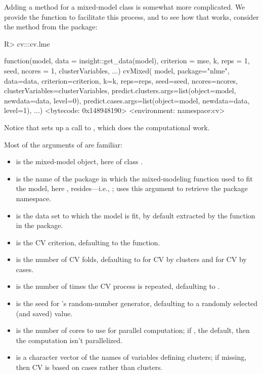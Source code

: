 \documentclass[
]{jss}
\begin{document}
Adding a  method for a mixed-model class is somewhat more
complicated. We provide the  function to facilitate this
process, and to see how that works, consider the  method
from the  package:

\begin{CodeChunk}
\begin{CodeInput}
R> cv:::cv.lme
\end{CodeInput}
\begin{CodeOutput}
function(model, data = insight::get_data(model), criterion = mse,
                   k, reps = 1, seed, ncores = 1, clusterVariables, ...){
  cvMixed(
    model,
    package="nlme",
    data=data,
    criterion=criterion,
    k=k,
    reps=reps,
    seed=seed,
    ncores=ncores,
    clusterVariables=clusterVariables,
    predict.clusters.args=list(object=model,
                               newdata=data,
                               level=0),
    predict.cases.args=list(object=model,
                            newdata=data,
                            level=1),
    ...)
}
<bytecode: 0x148948190>
<environment: namespace:cv>
\end{CodeOutput}
\end{CodeChunk}

Notice that  sets up a call to , which
does the computational work.

Most of the arguments of  are familiar:

\begin{itemize}
\item
   is the mixed-model object, here of class .
\item
   is the name of the package in which the mixed-modeling
  function used to fit the model, here , resides---i.e.,
  ;  uses this argument to retrieve the
  package namespace.
\item
   is the data set to which the model is fit, by default
  extracted by the  function in the 
  package.
\item
   is the CV criterion, defaulting to the 
  function.
\item
   is the number of CV folds, defaulting to  for CV
  by clusters and  for CV by cases.
\item
   is the number of times the CV process is repeated,
  defaulting to .
\item
   is the seed for 's random-number generator,
  defaulting to a randomly selected (and saved) value.
\item
   is the number of cores to use for parallel computation;
  if , the default, then the computation isn't parallelized.
\item
   is a character vector of the names of
  variables defining clusters; if missing, then CV is based on cases
  rather than clusters.
\end{itemize}
\end{document}

